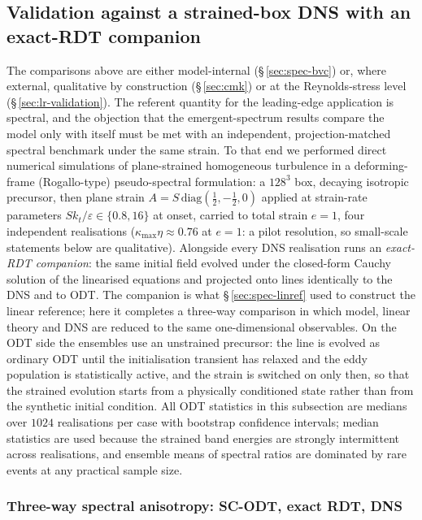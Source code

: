 \documentclass[lineno]{JFM-FLM_Au}
\begin{document}
\subsection{Validation against a strained-box DNS with an exact-RDT
companion}\label{sec:box-dns}

The comparisons above are either model-internal
(\S\,\ref{sec:spec-bvc}) or, where external, qualitative by construction
(\S\,\ref{sec:cmk}) or at the Reynolds-stress level
(\S\,\ref{sec:lr-validation}). The referent quantity for the
leading-edge application is spectral, and the objection that the
emergent-spectrum results compare the model only with itself must be met
with an independent, projection-matched spectral benchmark under the
same strain. To that end
we performed direct numerical simulations of plane-strained homogeneous
turbulence in a deforming-frame (Rogallo-type) pseudo-spectral formulation:
a $128^3$ box, decaying isotropic precursor, then plane strain
$A=S\,\mathrm{diag}(\tfrac12,-\tfrac12,0)$ applied at strain-rate
parameters $Sk_t/\varepsilon\in\{0.8,16\}$ at onset, carried to total
strain $e=1$, four independent realisations
($\kappa_{\max}\eta\approx0.76$ at $e=1$: a pilot resolution, so
small-scale statements below are qualitative). Alongside every DNS
realisation runs an \emph{exact-RDT companion}: the same initial field
evolved under the closed-form Cauchy solution of the linearised equations
and projected onto lines identically to the DNS and to ODT. The companion
is what \S\,\ref{sec:spec-linref} used to construct the linear reference;
here it completes a three-way comparison in which model, linear theory and
DNS are reduced to the same one-dimensional observables. On the ODT side
the ensembles use an unstrained precursor: the line is evolved as ordinary
ODT until the initialisation transient has relaxed and the eddy population
is statistically active, and the strain is switched on only then, so that
the strained evolution starts from a physically conditioned state rather
than from the synthetic initial condition. All ODT statistics in this
subsection are medians over $1024$ realisations per case with bootstrap
confidence intervals; median statistics are used because the strained band
energies are strongly intermittent across realisations, and ensemble means
of spectral ratios are dominated by rare events at any practical sample
size.

\subsubsection{Three-way spectral anisotropy: SC-ODT, exact RDT,
DNS}\label{sec:threeway}
\end{document}

